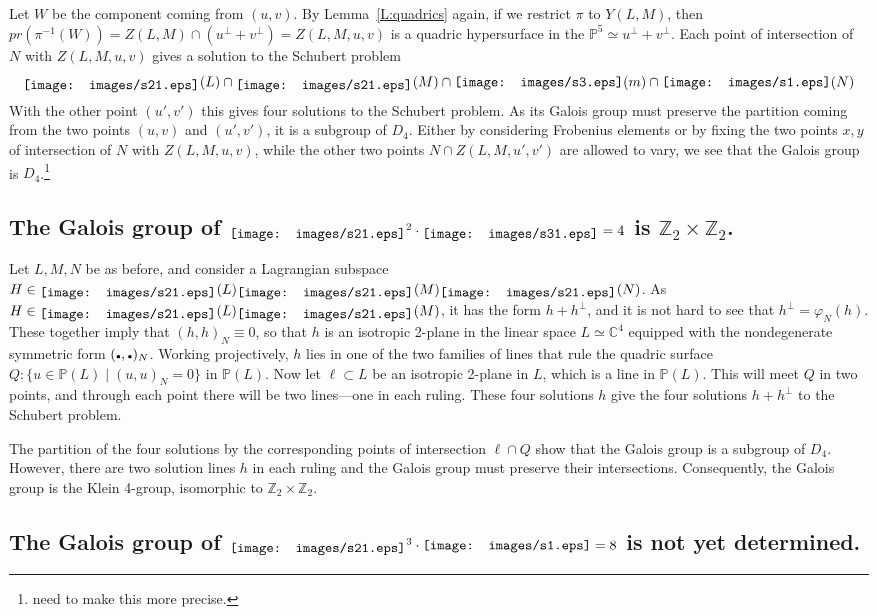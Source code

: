 \documentclass[12pt]{amsart}
\theoremstyle{remark}
\newcommand{\pr}{\textit{pr}}
\newcommand{\CC}{{\mathbb C}}
\newcommand{\PP}{{\mathbb P}}
\newcommand{\ZZ}{{\mathbb Z}}
\newcommand{\ndot}{\mbox{{\tiny$\bullet$}}}
\newcommand{\sI}{\texttt{[image: images/s1.eps]}}
\newcommand{\sTI}{\texttt{[image: images/s21.eps]}}
\newcommand{\sThI}{\texttt{[image: images/s31.eps]}}
\newcommand{\sTh}{\texttt{[image: images/s3.eps]}}
\newcommand{\schTI}{\raisebox{-2pt}{\sTI\hspace{.5pt}}}
\newcommand{\schThI}{\raisebox{-2pt}{\sThI\hspace{.5pt}}}
\begin{document}
Let $W$ be the component coming from $(u,v)$.
By Lemma~\ref{L:quadrics} again, if we restrict $\pi$ to $Y(L,M)$, then  $\pr(\pi^{-1}(W))=Z(L,M)\cap(u^\perp+v^\perp)=Z(L,M,u,v)$ is a quadric
hypersurface in the $\PP^5\simeq u^\perp+v^\perp$.
Each point of intersection of $N$ with $Z(L,M,u,v)$ gives a solution to the Schubert problem
\[
\schTI(L)\cap\schTI(M)\cap \sTh(m)\cap \sI(N)
\]
With the other point $(u',v')$ this gives four solutions to the Schubert problem.
As its Galois group must preserve the partition coming from the two points $(u,v)$ and $(u',v')$, it is a subgroup of $D_4$.
Either by considering Frobenius elements or by fixing the two points $x,y$ of intersection of $N$ with $Z(L,M,u,v)$, while the other two points
$N\cap Z(L,M,u',v')$ are allowed to vary, we see that the Galois group is $D_4$.\footnote{need to make this more precise.}


\subsection{The Galois group of $\schTI^2\cdot\schThI=4$ is $\ZZ_2\times\ZZ_2$.}

Let $L,M,N$ be as before, and consider a Lagrangian subspace $H\in\schTI(L)\schTI(M)\schTI(N)$.
As $H\in\schTI(L)\schTI(M)$, it has the form $h+h^\perp$, and it is not hard to see that $h^\perp=\varphi_N(h)$.
These together imply that $(h,h)_N\equiv 0$, so that $h$ is an isotropic 2-plane in the linear space $L\simeq\CC^4$ equipped with the
nondegenerate symmetric form $(\ndot,\ndot)_N$.
Working projectively, $h$ lies in one of the two families of lines that rule the quadric surface $Q\colon\{u\in\PP(L)\mid (u,u)_N=0\}$
in $\PP(L)$.
Now let $\ell\subset L$ be an isotropic 2-plane in $L$, which is a line in $\PP(L)$.
This will meet $Q$ in two points, and through each point there will be two lines---one in each ruling.
These four solutions $h$ give the four solutions $h+h^\perp$ to the Schubert problem.

The partition of the four solutions by the corresponding points of intersection $\ell\cap Q$ show that the Galois group is a subgroup of
$D_4$.
However,  there are two solution lines $h$ in each ruling and the Galois group must preserve their intersections.
Consequently, the Galois group is the Klein 4-group, isomorphic to  $\ZZ_2\times\ZZ_2$.


\subsection{The Galois group of $\schTI^3\cdot\sI=8$  is not yet determined.}









\end{document}
